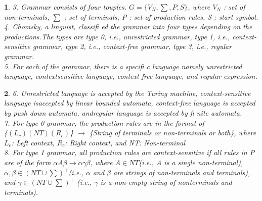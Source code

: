 \documentclass[12pt]{beamer}
\newtheorem{tex}{}
\begin{document}
	
	
	\begin{frame}
		
		\begin{tex}
		3. Grammar consists of four touples. $G = \{V_N, \sum, P, S\}$, where $V_N$ : set of non-terminals, $\sum$ : set
		of terminals, P : set of production rules, S : start symbol.\\
		4. Chomsky, a linguist, classifi ed the grammar into four types depending on the productions.The types are type 0, i.e., unrestricted grammar, type 1, i.e., context-sensitive grammar, type 2, i.e., context-free grammar, type 3, i.e., regular grammar.\\
		5. For each of the grammar, there is a specifi c language namely unrestricted language, contextsensitive language, context-free language, and regular expression.
		\end{tex}
		
	\end{frame}	
	
	
	
	\begin{frame}
		
		\begin{tex}
	6. Unrestricted language is accepted by the Turing machine, context-sensitive language isaccepted by linear bounded automata, context-free language is accepted by push down automata, andregular language is accepted by fi nite automata.\\
	7. For type 0 grammar, the production rules are in the format of\\ \{$(L_c)(NT)(R_c)$\} $\rightarrow$ \{String of terminals or non-terminals or both\}, where $L_c$: Left context, $R_c$: Right context, and NT: Non-terminal\\
	8. For type 1 grammar, all production rules are context-sensitive if all rules in P are of the form $\alpha A\beta \rightarrow \alpha\gamma\beta$, where $A \in NT $(i.e., A is a single non-terminal), $\alpha, \beta \in (NT \cup \sum)^+ $(i.e., $\alpha$ and $\beta$ are strings of non-terminals and terminals), and $\gamma \in (NT \cup \sum)^+ $ (i.e., $\gamma$ is a non-empty string of nonterminals and terminals).
		\end{tex}
		
		
	\end{frame}	
	
	
	
\end{document}
